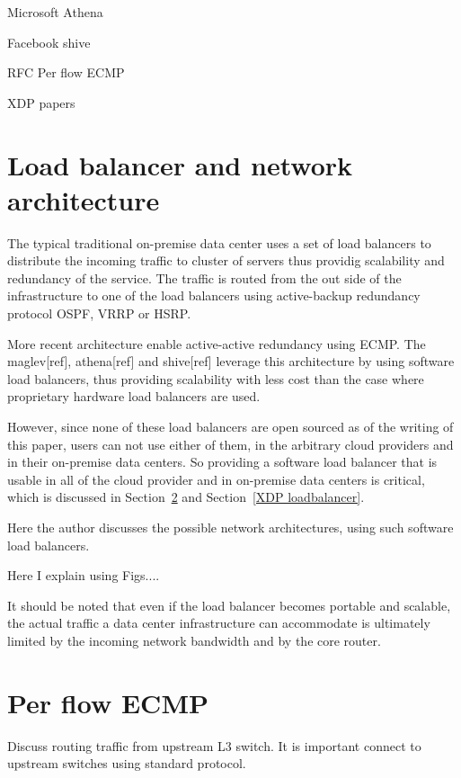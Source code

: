 Microsoft Athena

Facebook shive

RFC Per flow ECMP  

XDP papers

\section{Load balancer and network architecture}\label{Architecture}
The typical traditional on-premise data center uses a set of load balancers to distribute the incoming traffic to cluster of servers thus providig scalability and redundancy of the service.
The traffic is routed from the out side of the infrastructure to one of the load balancers using active-backup redundancy protocol OSPF, VRRP or HSRP.

More recent architecture enable active-active redundancy using ECMP. The maglev[ref], athena[ref] and shive[ref] leverage this architecture by using software load balancers, thus providing scalability with less cost than the case where proprietary hardware load balancers are used.

However, since none of these load balancers are open sourced as of the writing of this paper, users can not use either of them, in the arbitrary cloud providers and in their on-premise data centers.
So providing a software load balancer that is usable in all of the cloud provider and in on-premise data centers is critical, which is discussed in Section~\ref{IPVS} and Section~\ref{XDP loadbalancer}.

Here the author discusses the possible network architectures, using such software load balancers.

Here I explain using Figs....

It should be noted that even if the load balancer becomes portable and scalable, the actual traffic a data center infrastructure can accommodate is ultimately limited by the incoming network bandwidth and by the core router.

\section{Per flow ECMP}\label{IPVS}

Discuss routing traffic from upstream L3 switch. 
It is important connect to upstream switches using standard protocol.

